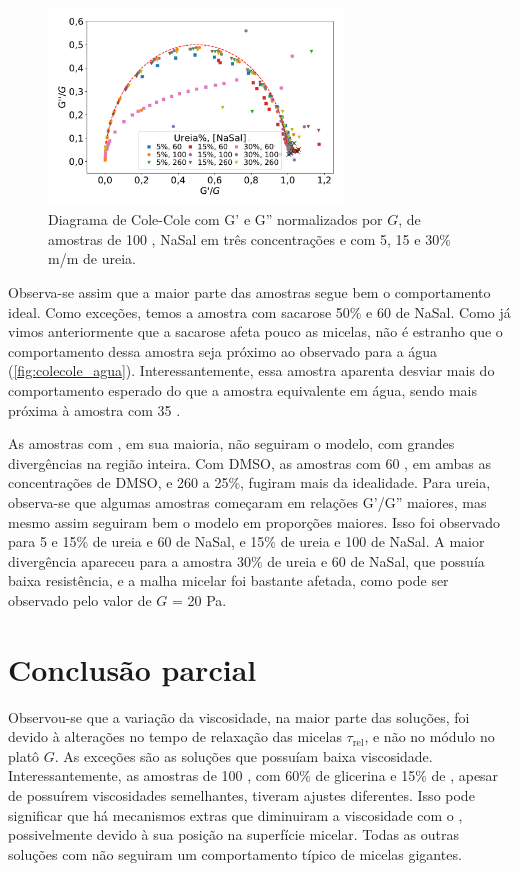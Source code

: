 		\begin{figure}[h]
			\centering
			\includegraphics[width=0.7\textwidth]{imagens/reologia/colecole_ureia}
			\caption{Diagrama de Cole-Cole com G' e G'' normalizados por \(G\), de amostras de \CTAB{} 100 \mM{}, NaSal em três concentrações e com 5, 15 e 30\% m/m de ureia.}
			\label{fig:colecole_ureia}
		\end{figure}

		Observa-se assim que a maior parte das amostras segue bem o comportamento ideal. Como exceções, temos a amostra com sacarose 50\% e 60 \mM{} de NaSal. Como já vimos anteriormente que a sacarose afeta pouco as micelas, não é estranho que o comportamento dessa amostra seja próximo ao observado para a água (\autoref{fig:colecole_agua}). Interessantemente, essa amostra aparenta desviar mais do comportamento esperado do que a amostra equivalente em água, sendo mais próxima à amostra com 35 \mM.
		
		As amostras com \BD, em sua maioria, não seguiram o modelo, com grandes divergências na região inteira. Com DMSO, as amostras com 60 \mM, em ambas as concentrações de DMSO, e 260 \mM{} a 25\%, fugiram mais da idealidade. Para ureia, observa-se que algumas amostras começaram em relações G'/G'' maiores, mas mesmo assim seguiram bem o modelo em proporções maiores. Isso foi observado para 5 e 15\% de ureia e 60 \mM{} de NaSal, e 15\% de ureia e 100 \mM{} de NaSal. A maior divergência apareceu para a amostra 30\% de ureia e 60 \mM{} de NaSal, que possuía baixa resistência, e a malha micelar foi bastante afetada, como pode ser observado pelo valor de \(G\) = 20 Pa.
		
		\section{Conclusão parcial} 
		
		Observou-se que a variação da viscosidade, na maior parte das soluções, foi devido à alterações no tempo de relaxação das micelas \(\tau_{\textrm{rel}}\), e não no módulo no platô \(G\). As exceções são as soluções que possuíam baixa viscosidade. Interessantemente, as amostras de 100 \mM{}, com 60\% de glicerina e 15\% de \BD{}, apesar de possuírem viscosidades semelhantes, tiveram ajustes diferentes. Isso pode significar que há mecanismos extras que diminuiram a viscosidade com o \BD{}, possivelmente devido à sua posição na superfície micelar. Todas as outras soluções com \BD{} não seguiram um comportamento típico de micelas gigantes.
		
